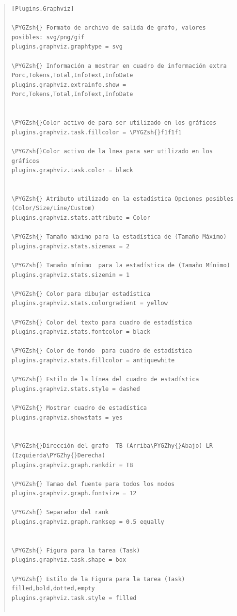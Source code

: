 \documentclass[letterpaper,11pt,spanish]{sphinxmanual}
\def\PYGZsh{\char`\#}
\def\PYGZhy{\char`\-}
\begin{document}
\begin{quote}

\begin{Verbatim}[commandchars=\\\{\}]
[Plugins.Graphviz]

\PYGZsh{} Formato de archivo de salida de grafo, valores posibles: svg/png/gif
plugins.graphviz.graphtype = svg

\PYGZsh{} Información a mostrar en cuadro de información extra Porc,Tokens,Total,InfoText,InfoDate
plugins.graphviz.extrainfo.show = Porc,Tokens,Total,InfoText,InfoDate


\PYGZsh{}Color activo de para ser utilizado en los gráficos
plugins.graphviz.task.fillcolor = \PYGZsh{}f1f1f1

\PYGZsh{}Color activo de la lnea para ser utilizado en los gráficos
plugins.graphviz.task.color = black


\PYGZsh{} Atributo utilizado en la estadística Opciones posibles (Color/Size/Line/Custom)
plugins.graphviz.stats.attribute = Color

\PYGZsh{} Tamaño máximo para la estadística de (Tamaño Máximo)
plugins.graphviz.stats.sizemax = 2

\PYGZsh{} Tamaño mínimo  para la estadística de (Tamaño Mínimo)
plugins.graphviz.stats.sizemin = 1

\PYGZsh{} Color para dibujar estadística
plugins.graphviz.stats.colorgradient = yellow

\PYGZsh{} Color del texto para cuadro de estadística
plugins.graphviz.stats.fontcolor = black

\PYGZsh{} Color de fondo  para cuadro de estadística
plugins.graphviz.stats.fillcolor = antiquewhite

\PYGZsh{} Estilo de la línea del cuadro de estadística
plugins.graphviz.stats.style = dashed

\PYGZsh{} Mostrar cuadro de estadística
plugins.graphviz.showstats = yes


\PYGZsh{}Dirección del grafo  TB (Arriba\PYGZhy{}Abajo) LR (Izquierda\PYGZhy{}Derecha)
plugins.graphviz.graph.rankdir = TB

\PYGZsh{} Tamao del fuente para todos los nodos
plugins.graphviz.graph.fontsize = 12

\PYGZsh{} Separador del rank
plugins.graphviz.graph.ranksep = 0.5 equally


\PYGZsh{} Figura para la tarea (Task)
plugins.graphviz.task.shape = box

\PYGZsh{} Estilo de la Figura para la tarea (Task) filled,bold,dotted,empty
plugins.graphviz.task.style = filled


\end{Verbatim}
\end{quote}
\end{document}
